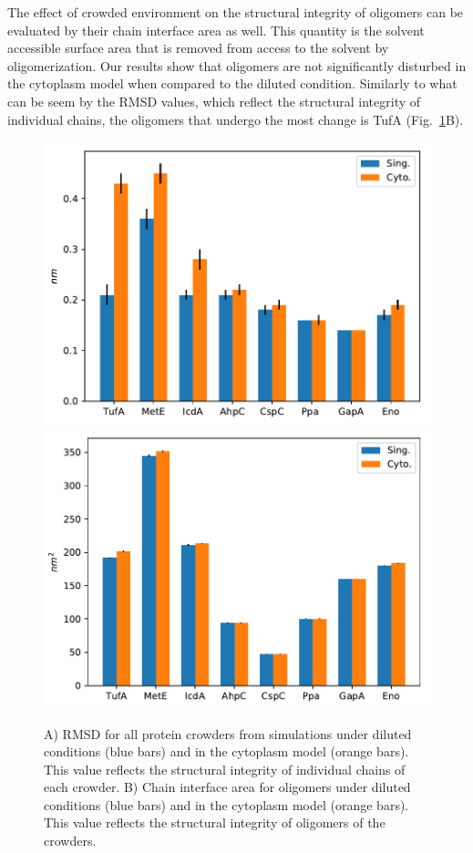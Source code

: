 \documentclass[journal=jcisd8,manuscript=article]{achemso}
\begin{document}
The effect of crowded environment on the structural integrity of
oligomers can be evaluated by their chain interface area as well. This
quantity is the solvent accessible surface area that is removed from
access to the solvent by oligomerization. Our results show that
oligomers are not significantly disturbed in the cytoplasm model when
compared to the diluted condition. Similarly to what can be seem by
the RMSD values, which reflect the structural integrity of individual
chains, the oligomers that undergo the most change is TufA
(Fig.~\ref{fig:structural_integrity_chain}B).

\begin{figure}[H]
\includegraphics[scale=0.5]{rmsd.pdf}
\includegraphics[scale=0.5]{sasa.pdf}
\caption{A) RMSD for all protein crowders from simulations under
  diluted conditions (blue bars) and in the cytoplasm model (orange
  bars). This value reflects the structural integrity of individual
  chains of each crowder. B) Chain interface area for oligomers under
  diluted conditions (blue bars) and in the cytoplasm model (orange
  bars). This value reflects the structural integrity of oligomers of
  the crowders.}
\label{fig:structural_integrity_chain}
\end{figure}
\end{document}
